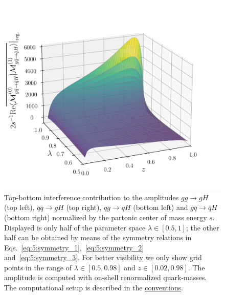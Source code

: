 \begin{figure}[h]
\begin{minipage}[t]{0.49\textwidth}
  \centering
  \includegraphics[width=\textwidth]{Images/RV_amplitudes/tOSbOS_gqB.pdf}
  \end{minipage}
  \caption{Top-bottom interference contribution to the amplitudes $gg \rightarrow gH$ (top left), $\bar{q}q \rightarrow g H$ (top right), $qg \rightarrow q H$ (bottom left) and $g \bar{q} \rightarrow \bar{q}H$ (bottom right) normalized by the partonic center of mass energy $s$. Displayed is only half of the parameter space $\lambda \in [0.5, 1]$; the other half can be obtained by means of the symmetry relations in Eqs.~\eqref{eq:5:symmetry_1},\ \eqref{eq:5:symmetry_2} and\ \eqref{eq:5:symmetry_3}. For better visibility we only show grid points in the range of $\lambda \in [0.5, 0.98]$ and $z \in [0.02, 0.98]$. The amplitude is computed with on-shell renormalized quark-masses. The computational setup is described in the \hyperref[chap:notation_and_conventions]{conventions}.}
  \label{fig:5:RV_tOSbOS}
\end{figure}
%
